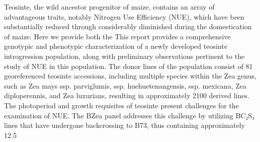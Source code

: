 \documentclass[10pt,letterpaper]{article}
\begin{document}
Teosinte, the wild ancestor progenitor of maize, contains an array of advantageous traits, notably Nitrogen Use Efficiency (NUE), which have been substantially reduced through considerably diminished during the domestication of maize. Here we provide both the This report provides a comprehensive genotypic and phenotypic characterization of a newly developed teosinte introgression population, along with preliminary observations pertinent to the study of NUE in this population. The donor lines of the population consist of 81 georeferenced teosinte accessions, including multiple species within the Zea genus, such as Zea mays ssp. parviglumis, ssp. huehuetenangensis, ssp. mexicana, Zea diploperennis, and Zea luxurians, resulting in approximately 2100 derived lines. The photoperiod and growth requisites of teosinte present challenges for the examination of NUE. The BZea panel addresses this challenge by utilizing BC₂S₃ lines that have undergone backcrossing to B73, thus containing approximately 12.5%
\end{document}
